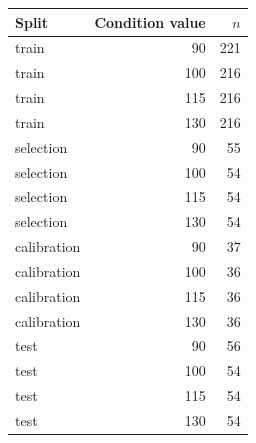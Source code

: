 \begin{tabular}{lrr}
\toprule
Split & Condition value & $n$\\
\midrule
train & 90 & 221\\
train & 100 & 216\\
train & 115 & 216\\
train & 130 & 216\\
selection & 90 & 55\\
selection & 100 & 54\\
selection & 115 & 54\\
selection & 130 & 54\\
calibration & 90 & 37\\
calibration & 100 & 36\\
calibration & 115 & 36\\
calibration & 130 & 36\\
test & 90 & 56\\
test & 100 & 54\\
test & 115 & 54\\
test & 130 & 54\\
\bottomrule
\end{tabular}
